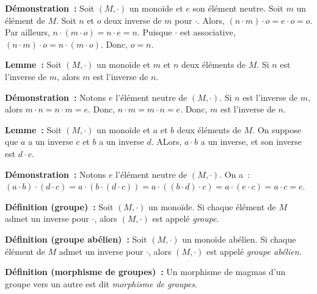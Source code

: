 \noindent\textbf{Démonstration :} Soit $(M,\cdot)$ un monoïde et $e$ son élément neutre. 
    Soit $m$ un élément de $M$. 
    Soit $n$ et $o$ deux inverse de $m$ pour $\cdot$. 
    Alors, $(n \cdot m) \cdot o = e \cdot o = o$.
    Par ailleurs, $n \cdot (m \cdot o) = n \cdot e = n$.
    Puisque $\cdot$ est associative, $(n \cdot m) \cdot o = n \cdot (m \cdot o)$. 
    Donc, $o = n$.

    \hfill \square

\medskip

\noindent\textbf{Lemme :} Soit $(M,\cdot)$ un monoïde et $m$ et $n$ deux éléments de $M$.
    Si $n$ est l'inverse de $m$, alors $m$ est l'inverse de $n$.

\medskip

\noindent\textbf{Démonstration :} 
    Notons $e$ l'élément neutre de $(M, \cdot)$.
    Si $n$ est l'inverse de $m$, alors $m \cdot n = n \cdot m = e$.
    Donc, $n \cdot m = m \cdot n = e$.
    Donc, $m$ est l'inverse de $n$.

    \done

\medskip

\noindent\textbf{Lemme :} Soit $(M,\cdot)$ un monoïde et $a$ et $b$ deux éléments de $M$.
    On suppose que $a$ a un inverse $c$ et $b$ a un inverse $d$. 
    ALors, $a \cdot b$ a un inverse, et son inverse est $d \cdot c$.

\medskip

\noindent\textbf{Démonstration :} 
    Notons $e$ l'élément neutre de $(M, \cdot)$.
    On a : $(a \cdot b) \cdot (d \cdot c) = a \cdot (b \cdot (d \cdot c)) = a \cdot ((b \cdot d) \cdot c) = a \cdot (e \cdot c) = a \cdot c = e$.

    \done

\medskip

\noindent\textbf{Définition (groupe) :} Soit $(M,\cdot)$ un monoïde. 
    Si chaque élément de $M$ admet un inverse pour $\cdot$, alors $(M,\cdot)$ est appelé \textit{groupe}.

\medskip

\noindent\textbf{Définition (groupe abélien) :} Soit $(M,\cdot)$ un monoïde abélien. 
    Si chaque élément de $M$ admet un inverse pour $\cdot$, alors $(M,\cdot)$ est appelé \textit{groupe abélien}.

\medskip

\noindent\textbf{Définition (morphisme de groupes) :} Un morphisme de magmas d'un groupe vers un autre est dit \textit{morphisme de groupes}.

\medskip


